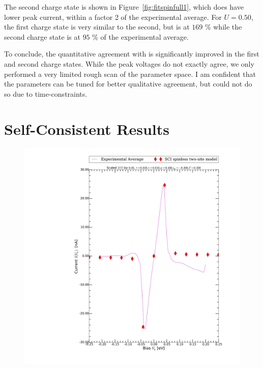 The second charge state is shown in Figure~\ref{fig:fitspinfull1}, which does have lower peak current, within a factor 2 of the experimental average. For $U=0.50$, the first charge state is very similar to the second, but is at $169$ \% while the second charge state is at $95$ \% of the experimental average.

To conclude, the quantitative agreement with \citet{perrinnano} is significantly improved in the first and second charge states. While the peak voltages do not exactly agree, we only performed a very limited rough scan of the parameter space. I am confident that the parameters can be tuned for better qualitative agreement, but could not do so due to time-constraints.

\section{Self-Consistent Results}
\label{sec:resultsselfconsistencycalc}

\begin{figure}[htb]
    \centering
    \includegraphics[width=.95\textwidth, clip=true, trim=11cm 2cm 2cm 0cm]{pdf/selfconsistent_fit_current_0.pdf}
    \caption{ }
    \label{fig:figselfconsistent}
\end{figure} 

\clearpage
{}